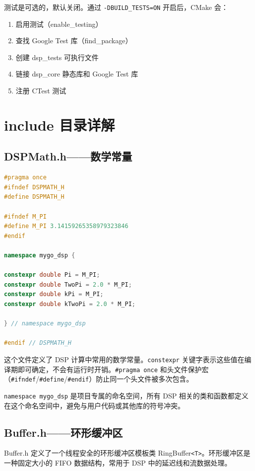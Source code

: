 ﻿\documentclass[12pt,a4paper,oneside]{ctexbook}
\begin{document}
测试是可选的，默认关闭。通过 \texttt{-DBUILD\_TESTS=ON} 开启后，CMake 会：
\begin{enumerate}
    \item 启用测试（enable\_testing）
    \item 查找 Google Test 库（find\_package）
    \item 创建 dsp\_tests 可执行文件
    \item 链接 dsp\_core 静态库和 Google Test 库
    \item 注册 CTest 测试
\end{enumerate}

\section{include 目录详解}

\subsection{DSPMath.h——数学常量}

\begin{lstlisting}[language=C++, caption={DSPMath.h——数学常量定义}]
#pragma once
#ifndef DSPMATH_H
#define DSPMATH_H

#ifndef M_PI
#define M_PI 3.14159265358979323846
#endif

namespace mygo_dsp {

constexpr double Pi = M_PI;
constexpr double TwoPi = 2.0 * M_PI;
constexpr double kPi = M_PI;
constexpr double kTwoPi = 2.0 * M_PI;

} // namespace mygo_dsp

#endif // DSPMATH_H
\end{lstlisting}

这个文件定义了 DSP 计算中常用的数学常量。\texttt{constexpr} 关键字表示这些值在编译期即可确定，不会有运行时开销。\texttt{\#pragma once} 和头文件保护宏（\texttt{\#ifndef}/\texttt{\#define}/\texttt{\#endif}）防止同一个头文件被多次包含。

\texttt{namespace mygo\_dsp} 是项目专属的命名空间，所有 DSP 相关的类和函数都定义在这个命名空间中，避免与用户代码或其他库的符号冲突。

\subsection{Buffer.h——环形缓冲区}

Buffer.h 定义了一个线程安全的环形缓冲区模板类 RingBuffer\texttt{<T>}。环形缓冲区是一种固定大小的 FIFO 数据结构，常用于 DSP 中的延迟线和流数据处理。
\end{document}
